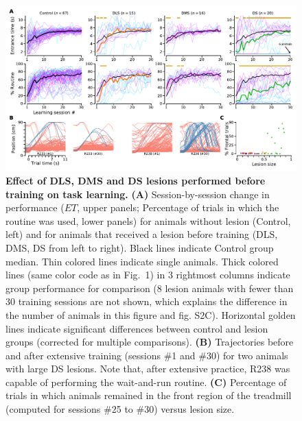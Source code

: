\begin{figure}[bth!]
	\begin{center}
		\includegraphics[width=\textwidth]{ch-lesion/figures/EarlyLesionLearning.pdf}
	   \caption
	   {\textbf{Effect of DLS, DMS and DS lesions performed before training on task learning.}
	   \textbf{(A)} Session-by-session change in performance ($ET$, upper panels; Percentage of trials in which the routine was used, lower panels) for animals without lesion (Control, left) and for animals that received a lesion before training (DLS, DMS, DS from left to right).
	   Black lines indicate Control group median.
	   Thin colored lines indicate single animals.
	   Thick colored lines (same color code as in Fig.~1) in 3 rightmost columns indicate group performance for comparison (8 lesion animals with fewer than 30 training sessions are not shown, which explains the difference in the number of animals in this figure and fig. S2C).
	   Horizontal golden lines indicate significant differences between control and lesion groups (corrected for multiple comparisons).
	   \textbf{(B)} Trajectories before and after extensive training (sessions \#1 and \#30) for two animals with large DS lesions. Note that, after extensive practice, R238 was capable of performing the wait-and-run routine.
	   \textbf{(C)} Percentage of trials in which animals remained in the front region of the treadmill (computed for sessions \#25 to \#30) versus lesion size.
	   }
	   \label{fig:lesion:EarlyLesionLearning}
	\end{center}
   \end{figure}
